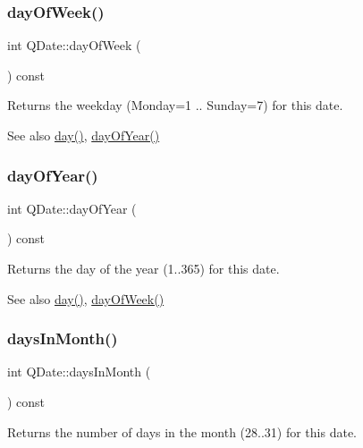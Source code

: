 \subsubsection{\texorpdfstring{dayOfWeek()}{dayOfWeek()}}
{\footnotesize\ttfamily int Q\+Date\+::day\+Of\+Week (\begin{DoxyParamCaption}{ }\end{DoxyParamCaption}) const}

Returns the weekday (Monday=1 .. Sunday=7) for this date.

\begin{DoxySeeAlso}{See also}
\mbox{\hyperlink{class_q_date_a4da6cc4ed155922c376d61102ffcb372}{day()}}, \mbox{\hyperlink{class_q_date_ac62a08183c6fdd45f2a96e8f91b0f7a2}{day\+Of\+Year()}} 
\end{DoxySeeAlso}
\mbox{\label{class_q_date_ac62a08183c6fdd45f2a96e8f91b0f7a2}} 
\subsubsection{\texorpdfstring{dayOfYear()}{dayOfYear()}}
{\footnotesize\ttfamily int Q\+Date\+::day\+Of\+Year (\begin{DoxyParamCaption}{ }\end{DoxyParamCaption}) const}

Returns the day of the year (1..365) for this date.

\begin{DoxySeeAlso}{See also}
\mbox{\hyperlink{class_q_date_a4da6cc4ed155922c376d61102ffcb372}{day()}}, \mbox{\hyperlink{class_q_date_ae69fd6a7673886fc31ce220ef2137d39}{day\+Of\+Week()}} 
\end{DoxySeeAlso}
\mbox{\label{class_q_date_aa2321fc7b1bd778bd37a94e3c155e621}} 
\subsubsection{\texorpdfstring{daysInMonth()}{daysInMonth()}}
{\footnotesize\ttfamily int Q\+Date\+::days\+In\+Month (\begin{DoxyParamCaption}{ }\end{DoxyParamCaption}) const}

Returns the number of days in the month (28..31) for this date.


